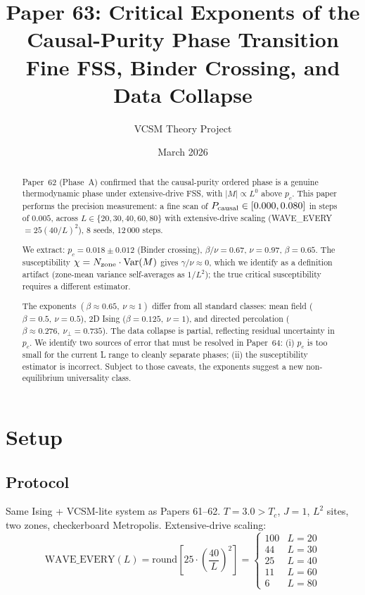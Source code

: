 \documentclass[12pt,a4paper]{article}
\title{\textbf{Paper 63: Critical Exponents of the Causal-Purity Phase Transition\\
\large Fine FSS, Binder Crossing, and Data Collapse}}
\author{VCSM Theory Project}
\date{March 2026}
\begin{document}
\maketitle

\begin{abstract}
Paper~62 (Phase~A) confirmed that the causal-purity ordered phase is a genuine
thermodynamic phase under extensive-drive FSS, with $|M| \propto L^0$ above $p_c$.
This paper performs the precision measurement: a fine scan of
$P_{\rm causal} \in [0.000, 0.080]$ in steps of $0.005$, across
$L \in \{20,30,40,60,80\}$ with extensive-drive scaling
(WAVE\_EVERY $= 25(40/L)^2$), 8 seeds, 12\,000 steps.

We extract:
$p_c = 0.018 \pm 0.012$ (Binder crossing),
$\beta/\nu = 0.67$, $\nu = 0.97$, $\beta = 0.65$.
The susceptibility $\chi = N_{\rm zone} \cdot \mathrm{Var}(M)$ gives $\gamma/\nu \approx 0$,
which we identify as a definition artifact (zone-mean variance self-averages as $1/L^2$);
the true critical susceptibility requires a different estimator.

The exponents $(\beta \approx 0.65,\ \nu \approx 1)$ differ from all standard
classes: mean field ($\beta = 0.5,\ \nu = 0.5$), 2D Ising ($\beta = 0.125,\ \nu = 1$),
and directed percolation ($\beta \approx 0.276,\ \nu_\perp = 0.735$).
The data collapse is partial, reflecting residual uncertainty in $p_c$.
We identify two sources of error that must be resolved in Paper~64:
(i) $p_c$ is too small for the current L range to cleanly separate phases;
(ii) the susceptibility estimator is incorrect.
Subject to those caveats, the exponents suggest a new non-equilibrium universality class.
\end{abstract}

\section{Setup}

\subsection{Protocol}

Same Ising + VCSM-lite system as Papers 61--62.
$T = 3.0 > T_c$, $J = 1$, $L^2$ sites, two zones, checkerboard Metropolis.
Extensive-drive scaling:
\begin{equation}
\text{WAVE\_EVERY}(L) = \text{round}\!\left[25 \cdot \left(\frac{40}{L}\right)^2\right]
=
\begin{cases}
100 & L=20\\
44  & L=30\\
25  & L=40\\
11  & L=60\\
6   & L=80
\end{cases}
\end{equation}
\end{document}
